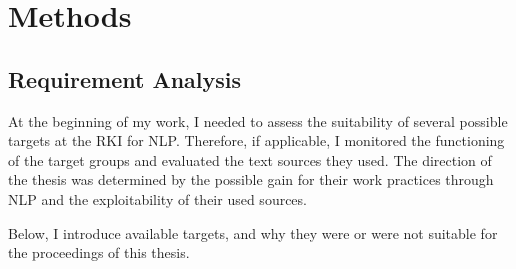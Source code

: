 \chapter{Methods}

\section{Requirement Analysis}
  At the beginning of my work, I needed to assess the suitability of several possible targets at the RKI for NLP.
  Therefore, if applicable, I monitored the functioning of the target groups and evaluated the text sources they used.
  The direction of the thesis was determined by the possible gain for their work practices through NLP and the exploitability of their used sources.

  Below, I introduce available targets, and why they were or were not suitable for the proceedings of this thesis.







